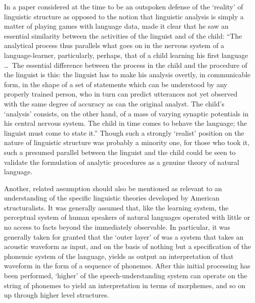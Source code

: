 In a paper considered at the time to be an outspoken defense of the
`reality' of linguistic structure as opposed to the notion that
linguistic analysis is simply a matter of playing games with language
data, \citet{hockett48:structure} made it clear that he saw an
essential similarity between the activities of the linguist and of the
child: ``The analytical process thus parallels what goes on in the
nervous system of a language-learner, particularly, perhaps, that of a
child learning his first language \ldots\ The essential difference
between the process in the child and the procedure of the linguist is
this: the linguist has to make his analysis overtly, in communicable
form, in the shape of a set of statements which can be understood by
any properly trained person, who in turn can predict utterances not
yet observed with the same degree of accuracy as can the original
analyst. The child's `analysis' consists, on the other hand, of a mass
of varying synaptic potentials in his central nervous system. The
child in time comes to behave the language; the linguist must come to
state it.'' Though such a strongly `realist' position on the nature of
linguistic structure was probably a minority one, for those who took
it, such a presumed parallel between the linguist and the child could
be seen to validate the formulation of analytic procedures as a
genuine theory of natural language.

Another, related assumption should also be mentioned as relevant to an
understanding of the specific linguistic theories developed by
American structuralists. It was generally assumed that, like the
learning system, the perceptual system of human speakers of natural
languages operated with little or no access to facts beyond the
immediately observable. In particular, it was generally taken for
granted that the `outer layer' of  was a system that
takes an acoustic waveform as input, and on the basis of nothing but a
specification of the phonemic system of the language, yields as output
an interpretation of that waveform in the form of a sequence of
phonemes. After this initial processing has been performed, `higher'
 of the speech-understanding system can operate on the string of
phonemes to yield an interpretation in terms of morphemes, and so on
up through higher level structures.

